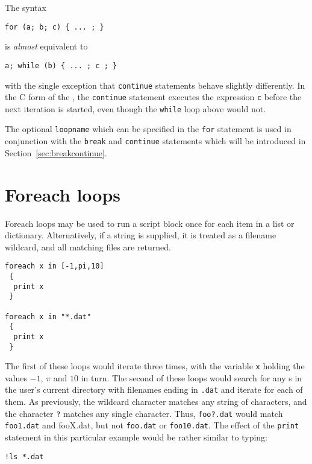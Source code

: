The syntax

\begin{verbatim}
for (a; b; c) { ... ; }
\end{verbatim}

\noindent is {\it almost} equivalent to

\begin{verbatim}
a; while (b) { ... ; c ; }
\end{verbatim}

\noindent with the single exception that {\tt continue} statements behave
slightly differently.  In the C form of the , the {\tt continue}
statement executes the expression {\tt c} before the next iteration is started,
even though the {\tt while} loop above would not.

The optional {\tt loopname} which can be specified in the {\tt for} statement
is used in conjunction with the {\tt break} and {\tt continue} statements which
will be introduced in Section~\ref{sec:breakcontinue}.

\section{Foreach loops}
\label{sec:foreach}

Foreach loops may be used to run a script block once for each item in a list or
dictionary. Alternatively, if a string is supplied, it is treated as a filename
wildcard, and all matching files are returned.

\begin{verbatim}
foreach x in [-1,pi,10]
 {
  print x
 }

foreach x in "*.dat"
 {
  print x
 }
\end{verbatim}

The first of these loops would iterate three times, with the variable {\tt x}
holding the values $-1$, $\pi$ and $10$ in turn. The second of these loops
would search for any \datafile s in the user's current directory with filenames
ending in {\tt .dat} and iterate for each of them. As previously, the wildcard
character {\tt *} matches any string of characters, and the character {\tt ?}
matches any single character. Thus, {\tt foo?.dat} would match {\tt foo1.dat}
and {fooX.dat}, but not {\tt foo.dat} or {\tt foo10.dat}. The effect of the
{\tt print} statement in this particular example would be rather similar to
typing:

\begin{verbatim}
!ls *.dat
\end{verbatim}

